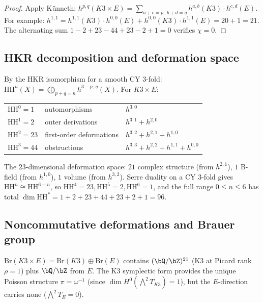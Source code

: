 \begin{proof}
Apply K\"unneth: $h^{p,q}(K3 \times E) = \sum_{a+c=p,\; b+d=q}
h^{a,b}(K3) \cdot h^{c,d}(E)$. For example:
$h^{1,1} = h^{1,1}(K3) \cdot h^{0,0}(E) + h^{0,0}(K3) \cdot
h^{1,1}(E) = 20 + 1 = 21$. The alternating sum
$1 - 2 + 23 - 44 + 23 - 2 + 1 = 0$ verifies $\chi = 0$.
\end{proof}

\subsection{HKR decomposition and deformation space}
\label{subsec:hkr-k3xe}

\begin{proposition}
\label{prop:hkr-k3xe}
By the HKR isomorphism for a smooth CY $3$-fold:
$\mathrm{HH}^n(X) = \bigoplus_{p+q=n} h^{3-p,\,q}(X)$.
For $K3 \times E$:
\begin{center}
\small
\renewcommand{\arraystretch}{1.2}
\begin{tabular}{lll}
$\mathrm{HH}^0 = 1$ & automorphisms & $h^{3,0}$ \\
$\mathrm{HH}^1 = 2$ & outer derivations & $h^{3,1} + h^{2,0}$ \\
$\mathrm{HH}^2 = 23$ & first-order deformations & $h^{3,2} + h^{2,1} + h^{1,0}$ \\
$\mathrm{HH}^3 = 44$ & obstructions & $h^{3,3} + h^{2,2} + h^{1,1} + h^{0,0}$
\end{tabular}
\end{center}
The $23$-dimensional deformation space: $21$ complex structure
\textup{(}from $h^{2,1}$\textup{)}, $1$ B-field \textup{(}from
$h^{1,0}$\textup{)}, $1$ volume \textup{(}from
$h^{3,2}$\textup{)}. Serre duality on a CY $3$-fold gives
$\mathrm{HH}^n \cong \mathrm{HH}^{6-n}$, so
$\mathrm{HH}^4 = 23, \mathrm{HH}^5 = 2, \mathrm{HH}^6 = 1$, and the
full range $0 \le n \le 6$ has total
$\dim \mathrm{HH}^* = 1 + 2 + 23 + 44 + 23 + 2 + 1 = 96$.
\end{proposition}

\subsection{Noncommutative deformations and Brauer group}
\label{subsec:nc-brauer}

\begin{remark}
\label{rem:brauer-k3xe}
$\mathrm{Br}(K3 \times E) = \mathrm{Br}(K3) \oplus \mathrm{Br}(E)$
contains $(\bQ/\bZ)^{21}$ (K3 at Picard rank $\rho = 1$) plus
$\bQ/\bZ$ from $E$. The K3 symplectic form provides the unique
Poisson structure $\pi = \omega^{-1}$ (since $\dim H^0(\bigwedge^2
T_{K3}) = 1$), but the $E$-direction carries none
($\bigwedge^2 T_E = 0$).
\end{remark}

